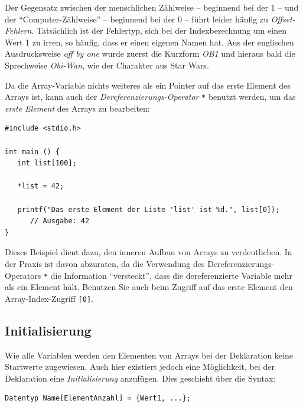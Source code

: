 \begin{hintbox}
Der Gegensatz zwischen der menschlichen Zählweise -- beginnend bei der 1 -- und der \enquote{Computer-Zählweise} -- beginnend bei der 0 -- führt leider häufig zu \emph{Offset-Fehlern}. Tatsächlich ist der Fehlertyp, sich bei der Indexberechnung um einen Wert 1 zu irren, so häufig, dass er einen eigenen Namen hat. Aus der englischen Ausdrucksweise \emph{off by one} wurde zuerst die Kurzform \emph{OB1} und hieraus bald die Sprechweise \emph{Obi-Wan}, wie der Charakter aus Star Wars.
\end{hintbox}

Da die Array-Variable nichts weiteres als ein Pointer auf das erste Element des Arrays ist, kann auch der \emph{Dereferenzierungs-Operator} \texttt{*} benutzt werden, um das \emph{erste Element} des Arrays zu bearbeiten:

\begin{codebox}
\begin{verbatim}
#include <stdio.h>

int main () {
   int list[100];
   
   *list = 42;
   
   printf("Das erste Element der Liste 'list' ist %d.", list[0]);
      // Ausgabe: 42
}
\end{verbatim}
\end{codebox}

Dieses Beispiel dient dazu, den inneren Aufbau von Arrays zu verdeutlichen. In der Praxis ist davon abzuraten, da die Verwendung des Dereferenzierungs-Operators \texttt{*} die Information \enquote{versteckt}, dass die dereferenzierte Variable mehr als ein Element hält. Benutzen Sie auch beim Zugriff auf das erste Element den Array-Index-Zugriff \texttt{[0]}.

\subsection{Initialisierung} \label{sec:arrayInit}
Wie alle Variablen werden den Elementen von Arrays bei der Deklaration keine Startwerte zugewiesen. Auch hier existiert jedoch eine Möglichkeit, bei der Deklaration eine \emph{Initialisierung} anzufügen. Dies geschieht über die Syntax:

\begin{codebox}
\begin{verbatim}
Datentyp Name[ElementAnzahl] = {Wert1, ...};
\end{verbatim}
\end{codebox}

